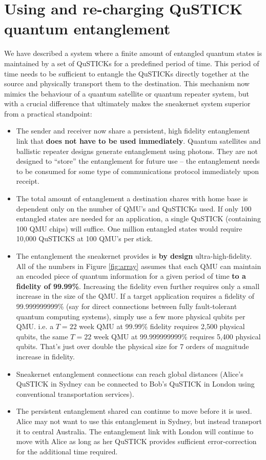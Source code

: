 \documentclass[aps,prl,twocolumn,10pt,nofootinbib]{revtex4}
\begin{document}
\section{Using and re-charging QuSTICK quantum entanglement}
We have described a system where a finite amount of entangled quantum states is maintained by a set of QuSTICKs for a predefined period of time.  This period of time needs to be sufficient to entangle the QuSTICKs directly together at the source and physically transport them to the destination.  This mechanism now mimics the behaviour of a quantum satellite or quantum repeater system, but with a crucial difference that ultimately makes the sneakernet system superior from a practical standpoint:
\begin{itemize}
\item The sender and receiver now share a persistent, high fidelity entanglement link that {\bf does not have to be used immediately}.  Quantum satellites and ballistic repeater designs generate entanglement using photons.  They are not designed to ``store'' the entanglement for future use -- the entanglement needs to be consumed for some type of communications protocol immediately upon receipt.
\item The total amount of entanglement a destination shares with home base is dependent only on the number of QMU's and QuSTICKs used.  If only 100 entangled states are needed for an application, a single QuSTICK (containing 100 QMU chips) will suffice. One million entangled states would require 10,000 QuSTICKS at 100 QMU's per stick.  
\item The entanglement the sneakernet provides is {\bf by design} ultra-high-fidelity.  All of the numbers in Figure \ref{fig:array} assumes that each QMU can maintain an encoded piece of quantum information for a given period of time {\bf to a fidelity of 99.99\%}.  Increasing the fidelity even further requires only a small increase in the size of the QMU.  If a target application requires a fidelity of 99.999999999\% (say for direct connections between fully fault-tolerant quantum computing systems), simply use a few more physical qubits per QMU.  i.e. a $T= 22$ week QMU at 99.99\% fidelity requires 2,500 physical qubits, the same $T=22$ week QMU at 99.999999999\% requires 5,400 physical qubits.  That's just over double the physical size for 7 orders of magnitude increase in fidelity.
\item Sneakernet entanglement connections can reach global distances (Alice's QuSTICK in Sydney can be connected to Bob's QuSTICK in London using conventional transportation services).
\item The persistent entanglement shared can continue to move before it is used.  Alice may not want to use this entanglement in Sydney, but instead transport it to central Australia.  The entanglement link with London will continue to move with Alice as long as her QuSTICK provides sufficient error-correction for the additional time required.
\end{itemize}
\end{document}

